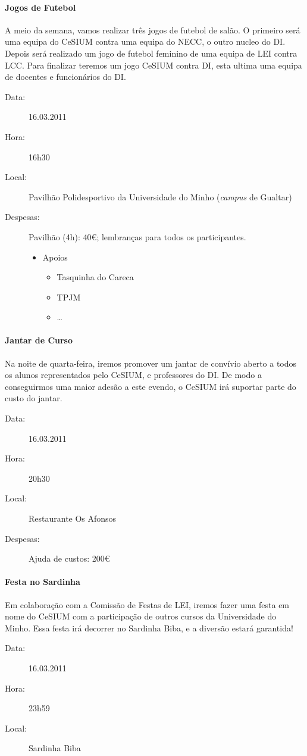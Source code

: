 \paragraph{Jogos de Futebol}
A meio da semana, vamos realizar três jogos de futebol de salão. O primeiro será uma equipa do CeSIUM contra uma equipa do NECC, o outro nucleo do DI. Depois será realizado um jogo de futebol feminino de uma equipa de LEI contra LCC. Para finalizar teremos um jogo CeSIUM contra DI, esta ultima uma equipa de docentes e funcionários do DI.
\begin{description}
\item[Data:] 16.03.2011
\item[Hora:] 16h30
\item[Local:] Pavilhão Polidesportivo da Universidade do Minho (\emph{campus} de Gualtar)
\item[Despesas:] Pavilhão (4h): 40\euro; lembranças para todos os participantes.
\begin{itemize}
\item Apoios
\begin{itemize}
\item Tasquinha do Careca
\item TPJM
\item \dots  
\end{itemize}
\end{itemize}
\end{description}
%
\paragraph{Jantar de Curso}
Na noite de quarta-feira, iremos promover um jantar de convívio aberto a todos os alunos representados pelo CeSIUM, e professores do DI. De modo a conseguirmos uma maior adesão a este evendo, o CeSIUM irá suportar parte do custo do jantar.\begin{description}
\item[Data:] 16.03.2011
\item[Hora:] 20h30
\item[Local:] Restaurante Os Afonsos
\item[Despesas:] Ajuda de custos: 200\euro
\end{description}
%
\paragraph{Festa no Sardinha}
Em colaboração com a Comissão de Festas de LEI, iremos fazer uma festa em nome do CeSIUM com a participação de outros cursos da Universidade do Minho. Essa festa irá decorrer no Sardinha Biba, e a diversão estará garantida!
\begin{description}
\item[Data:] 16.03.2011
\item[Hora:] 23h59
\item[Local:] Sardinha Biba
\end{description}
